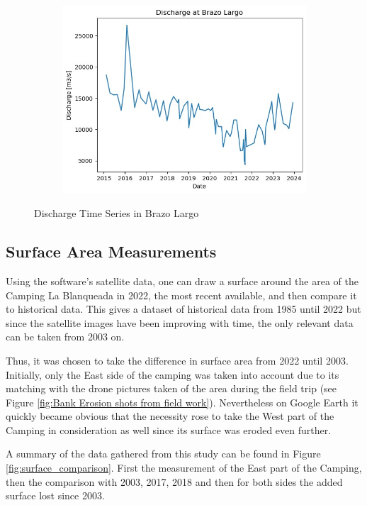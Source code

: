 \begin{figure}[H]
    \centering
    \begin{subfigure}{0.48\textwidth}
        \includegraphics[width=\linewidth]{figures/ch5/dischargepeak.jpg}
    \end{subfigure}
    
    \caption{Discharge Time Series in Brazo Largo}
    \label{fig:Discharge Changes in Brazo Largo}
\end{figure}

\subsection{Surface Area Measurements}
Using the software's satellite data, one can draw a surface around the area of the Camping La Blanqueada in 2022, the most recent available, and then compare it to historical data. 
This gives a dataset of historical data from 1985 until 2022 but since the satellite images have been improving with time, the only relevant data can be taken from 2003 on.

Thus, it was chosen to take the difference in surface area from 2022 until 2003. Initially, only the East side of the camping was taken into account due to its matching with the drone pictures taken of the area during the field trip (see Figure \ref{fig:Bank Erosion shots from field work}). Nevertheless on Google Earth it quickly became obvious that the necessity rose to take the West part of the Camping in consideration as well since its surface was eroded even further.

A summary of the data gathered from this study can be found in Figure \ref{fig:surface_comparison}. First the measurement of the East part of the Camping, then the comparison with 2003, 2017, 2018 and then for both sides the added surface lost since 2003.

